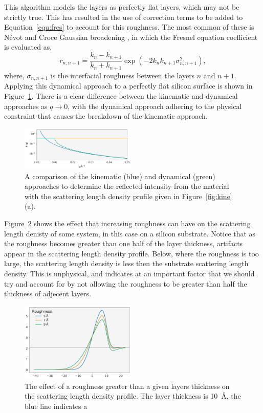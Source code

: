 \documentclass[
 reprint,
 superscriptaddress,
 amsmath,amssymb,
 aps,
]{revtex4-1}
\begin{document}
This algorithm models the layers as perfectly flat layers, which may not be strictly true. 
This has resulted in the use of correction terms to be added to Equation~\ref{equ:fres} to account for this roughness. 
The most common of these is N\'{e}vot and Croce Gaussian broadening \cite{nevot_caracterisation_1980}, in which the Fresnel equation coefficient is evaluated as, 
%
\begin{equation}
    r_{n, n+1} = \frac{k_n - k_{n+1}}{k_n + k_{n+1}} \exp{(-2k_nk_{n+1}\sigma^2_{n,n+1})},
\end{equation}
%
where, $\sigma_{n, n+1}$ is the interfacial roughness between the layers $n$ and $n+1$. 
Applying this dynamical approach to a perfectly flat silicon surface is shown in Figure~\ref{fig:dyna}.
There is a clear difference between the kinematic and dynamical approaches as $q \to 0$, with the dynamical approach adhering to the physical constraint that causes the breakdown of the kinematic approach.  
%
\begin{figure}[t]
    \includegraphics[width=0.49\textwidth]{dyna}
    \caption{A comparison of the kinematic (blue) and dynamical (green) approaches to determine the reflected intensity from the material with the scattering length density profile given in Figure~\ref{fig:kine}(a).}
    \label{fig:dyna}
\end{figure}
%

Figure~\ref{fig:rough} shows the effect that increasing roughness can have on the scattering length denisty of some system, in this case  on a silicon substrate. 
Notice that as the roughness becomes greater than one half of the layer thickness, artifacts appear in the scattering length density profile. 
Below, where the roughness is too large, the scattering length density is less then the substrate scattering length density. 
This is unphysical, and indicates at an important factor that we should try and account for by not allowing the roughness to be greater than half the thickness of adjecent layers. 
%
\begin{figure}[t]
    \includegraphics[width=0.49\textwidth]{roughness}
    \caption{The effect of a roughness greater than a given layers thickness on the scattering length density profile. The layer thickness is \SI{10}{\angstrom}, the blue line indicates a }
    \label{fig:rough}
\end{figure}
%
\end{document}
